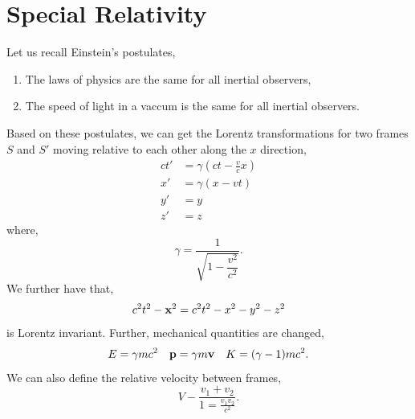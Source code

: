 \documentclass{book}
\begin{document}
\chapter{Special Relativity}
Let us recall Einstein's postulates,
\begin{enumerate}
	\item The laws of physics are the same for all inertial observers,
	\item The speed of light in a vaccum is the same for all inertial observers.
\end{enumerate}
Based on these postulates, we can get the Lorentz transformations for two frames $S$ and $S'$ moving relative to each other along the $x$ direction,
\begin{align}
	ct' & = \gamma\left(ct - \frac{v}{c}x\right) \\
	x' & = \gamma\left(x - vt\right) \\
	y' & = y\\
	z' & = z
\end{align}
where,
\begin{equation}
	\gamma = \dfrac{1}{\sqrt{1 - \dfrac{v^2}{c^2}}}.
\end{equation}
We further have that,
\begin{equation}
	c^2t^2 - \vb{x}^2 = c^2t^2 - x^2 - y^2 - z^2
\end{equation}
is Lorentz invariant. Further, mechanical quantities are changed,
\begin{align}
	E = \gamma mc^2 && \vb{p} = \gamma m\vb{v} && K = (\gamma - 1)mc^2.
\end{align}
We can also define the relative velocity between frames,
\begin{equation}
	V - \frac{v_1 + v_2}{1 = \frac{v_1v_2}{c^2}}.
\end{equation}
\end{document}
